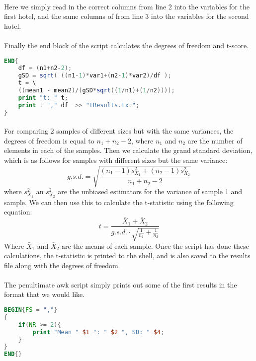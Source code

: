 \documentclass[10pt]{article}
\begin{document}
\paragraph{}
Here we simply read in the correct columns from line 2 into the variables for the first hotel, and the same columns of from line 3 into the variables for the second hotel.
\paragraph{}
Finally the end block of the script calculates the degrees of freedom and t-score.
\begin{lstlisting}[language=awk]
END{
	df = (n1+n2-2); 
	gSD = sqrt( ((n1-1)*var1+(n2-1)*var2)/df );
	t = \
	((mean1 - mean2)/(gSD*sqrt((1/n1)+(1/n2))));
	print "t: " t;
	print t "," df  >> "tResults.txt";
}
\end{lstlisting}
\paragraph{}
For comparing 2 samples of different sizes but with the same variances, the degrees of freedom is equal to $n_{1} + n_{2} - 2$, where $n_1$ and $n_2$ are the number of elements in each of the samples. Then we calculate the grand standard deviation, which is as follows for samples with different sizes but the same variance:
\begin{equation} \label{eq:gsd}
g.s.d. = \sqrt{\frac{(n_{1}-1)s^{2}_{X_1} + (n_{2}-1)s^{2}_{X_2}}{n_{1} + n_{2} - 2}}
\end{equation} 
where $s^{2}_{X_1}$ an $s^{2}_{X_2}$ are the unbiased estimators for the variance of sample 1 and sample.
We can then use this to calculate the t-statistic using the following equation:
\begin{equation} \label{eq:t-stat}
t = \frac{\bar{X}_1+\bar{X}_2}{g.s.d. \cdot \sqrt{\frac{1}{n_1} + \frac{1}{n_2}}}
\end{equation}
Where $\bar{X}_1$ and $\bar{X}_2$ are the means of each sample.
Once the script has done these calculations, the t-statistic is printed to the shell, and is also saved to the results file along with the degrees of freedom.
\paragraph{}
The penultimate awk script simply prints out some of the first results in the format that we would like.
\begin{lstlisting}[language=awk]
BEGIN{FS = ","}
{
	if(NR >= 2){
		print "Mean " $1 ": " $2 ", SD: " $4;
	}
}
END{}
\end{lstlisting}
\end{document}
